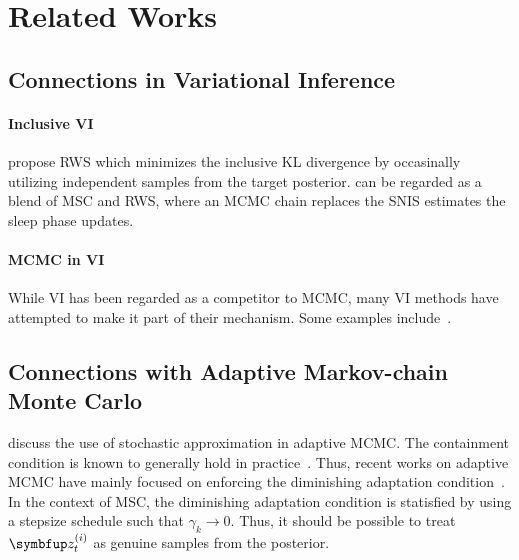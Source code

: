 
\section{Related Works}
\subsection{Connections in Variational Inference}
\paragraph{Inclusive VI}
\citet{DBLP:journals/corr/BornscheinB14} propose RWS which minimizes the inclusive KL divergence by occasinally utilizing independent samples from the target posterior.
\citep{kim2021adaptive} can be regarded as a blend of MSC and RWS, where an MCMC chain replaces the SNIS estimates the sleep phase updates.

\paragraph{MCMC in VI}
While VI has been regarded as a competitor to MCMC, many VI methods have attempted to make it part of their mechanism.
Some examples include~\citep{pmlr-v97-ruiz19a}.

\subsection{Connections with Adaptive Markov-chain Monte Carlo}
\citet{10.1007/s11222-008-9110-y, garthwaite_adaptive_2016} discuss the use of stochastic approximation in adaptive MCMC.
The containment condition is known to generally hold in practice~\citep{rosenthal_optimal_, article}.
Thus, recent works on adaptive MCMC have mainly focused on enforcing the diminishing adaptation condition~\citep{wang_adaptive_2013}.
In the context of MSC, the diminishing adaptation condition is statisfied by using a stepsize schedule such that \(\gamma_k \rightarrow 0\).
Thus, it should be possible to treat \(\vz^{(i)}_t\) as genuine samples from the posterior.


